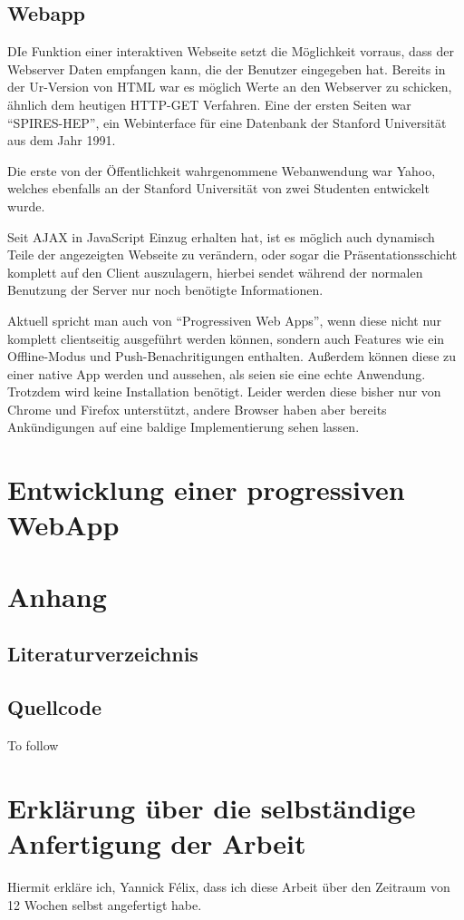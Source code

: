 \documentclass[a4paper,12pt]{scrartcl}      %
\let\oldcite\cite
\renewcommand{\cite}[1]{\textsuperscript{\oldcite{#1}}}
\begin{document}
	\subsection{Webapp}
	DIe Funktion einer interaktiven Webseite setzt die Möglichkeit vorraus, dass der Webserver Daten empfangen kann, die der Benutzer eingegeben hat. Bereits in der Ur-Version von HTML war es möglich Werte an den Webserver zu schicken, ähnlich dem heutigen HTTP-GET Verfahren. Eine der ersten Seiten war ``SPIRES-HEP'', ein Webinterface für eine Datenbank der Stanford Universität aus dem Jahr 1991.\par
	Die erste von der Öffentlichkeit wahrgenommene Webanwendung war Yahoo, welches ebenfalls an der Stanford Universität von zwei Studenten entwickelt wurde.\par
	Seit AJAX in JavaScript Einzug erhalten hat, ist es möglich auch dynamisch Teile der angezeigten Webseite zu verändern, oder sogar die Präsentationsschicht komplett auf den Client auszulagern, hierbei sendet während der normalen Benutzung der Server nur noch benötigte Informationen.\cite{webappWiki}\par
	Aktuell spricht man auch von ``Progressiven Web Apps'', wenn diese nicht nur komplett clientseitig ausgeführt werden können, sondern auch Features wie ein Offline-Modus und Push-Benachritigungen enthalten. Außerdem können diese zu einer native App werden und aussehen, als seien sie eine echte Anwendung. Trotzdem wird keine Installation benötigt. Leider werden diese bisher nur von Chrome und Firefox unterstützt, andere Browser haben aber bereits Ankündigungen auf eine baldige Implementierung sehen lassen.\cite{prwebappWiki}\par
	
	\newpage
	\section{Entwicklung einer progressiven WebApp}
	\newpage
	
	\newpage
	\section{Anhang}
	\subsection{Literaturverzeichnis}
	\printbibliography[heading=none]
	
	\subsection{Quellcode}
	To follow
	
	\newpage
	\section{Erklärung über die selbständige Anfertigung der Arbeit}
	Hiermit erkläre ich, Yannick F\'{e}lix, dass ich diese Arbeit über den Zeitraum von 12 Wochen selbst angefertigt habe.
	\doclicenseThis
\end{document}
